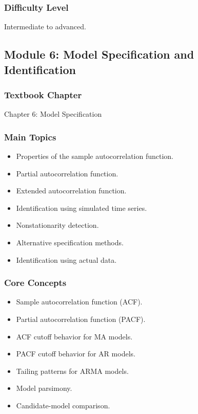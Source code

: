 \documentclass[11pt]{article}
\begin{document}
\subsubsection*{Difficulty Level}
Intermediate to advanced.

\subsection{Module 6: Model Specification and Identification}

\subsubsection*{Textbook Chapter}
Chapter 6: Model Specification

\subsubsection*{Main Topics}
\begin{itemize}
    \item Properties of the sample autocorrelation function.
    \item Partial autocorrelation function.
    \item Extended autocorrelation function.
    \item Identification using simulated time series.
    \item Nonstationarity detection.
    \item Alternative specification methods.
    \item Identification using actual data.
\end{itemize}

\subsubsection*{Core Concepts}
\begin{itemize}
    \item Sample autocorrelation function (ACF).
    \item Partial autocorrelation function (PACF).
    \item ACF cutoff behavior for MA models.
    \item PACF cutoff behavior for AR models.
    \item Tailing patterns for ARMA models.
    \item Model parsimony.
    \item Candidate-model comparison.
\end{itemize}
\end{document}
